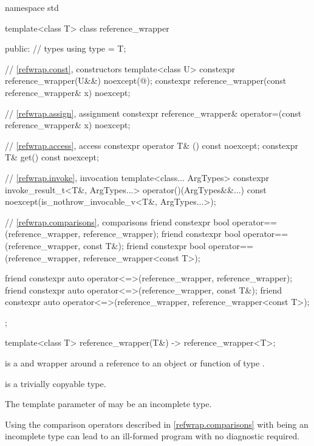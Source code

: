 %
%
\begin{codeblock}
namespace std {
  template<class T> class reference_wrapper {
  public:
    // types
    using type = T;

    // \ref{refwrap.const}, constructors
    template<class U>
      constexpr reference_wrapper(U&&) noexcept(@\seebelow@);
    constexpr reference_wrapper(const reference_wrapper& x) noexcept;

    // \ref{refwrap.assign}, assignment
    constexpr reference_wrapper& operator=(const reference_wrapper& x) noexcept;

    // \ref{refwrap.access}, access
    constexpr operator T& () const noexcept;
    constexpr T& get() const noexcept;

    // \ref{refwrap.invoke}, invocation
    template<class... ArgTypes>
      constexpr invoke_result_t<T&, ArgTypes...> operator()(ArgTypes&&...) const
        noexcept(is_nothrow_invocable_v<T&, ArgTypes...>);

    // \ref{refwrap.comparisons}, comparisons
    friend constexpr bool operator==(reference_wrapper, reference_wrapper);
    friend constexpr bool operator==(reference_wrapper, const T&);
    friend constexpr bool operator==(reference_wrapper, reference_wrapper<const T>);

    friend constexpr auto operator<=>(reference_wrapper, reference_wrapper);
    friend constexpr auto operator<=>(reference_wrapper, const T&);
    friend constexpr auto operator<=>(reference_wrapper, reference_wrapper<const T>);
  };

  template<class T>
    reference_wrapper(T&) -> reference_wrapper<T>;
}
\end{codeblock}

\pnum
{} is a  and  wrapper
around a reference to an object or function of type .

\pnum
{} is
a trivially copyable type.

\pnum
The template parameter  of 
may be an incomplete type.
\begin{note}
Using the comparison operators described in \ref{refwrap.comparisons}
with  being an incomplete type
can lead to an ill-formed program
with no diagnostic required.
\end{note}

